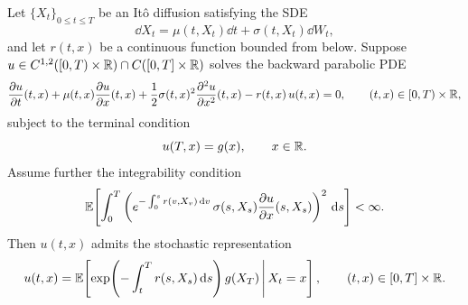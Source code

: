\begin{theorem}
\label{thm:feynman-kac}
Let $\{X_t\}_{0 \le t \le T}$ be an It\^o diffusion satisfying the SDE
\[
\dd X_t = \mu(t, X_t)\dd t + \sigma(t, X_t)\dd W_t,
\]
and let $r(t, x)$ be a continuous function bounded from below. Suppose $u \in C^{1,2}([0, T) \times \mathbb{R}) \cap C([0, T] \times \mathbb{R})$ solves the backward parabolic PDE
\begin{equation}
\label{eq:feynman-kac-pde}
\frac{\partial u}{\partial t}(t, x) + \mu(t, x)\frac{\partial u}{\partial x}(t, x) + \frac{1}{2}\sigma(t, x)^2 \frac{\partial^2 u}{\partial x^2}(t, x) - r(t, x)\, u(t, x) = 0, \qquad (t, x) \in [0, T) \times \mathbb{R},
\end{equation}
subject to the terminal condition
\[
u(T, x) = g(x), \qquad x \in \mathbb{R}.
\]
Assume further the integrability condition
\begin{equation}
\label{eq:fk-integrability}
\mathbb{E}\!\left[\int_0^T \left(e^{-\int_0^s r(v, X_v)\,\mathrm{d} v}\,\sigma(s, X_s)\frac{\partial u}{\partial x}(s, X_s)\right)^2 \,\mathrm{d} s\right] < \infty.
\end{equation}
Then $u(t, x)$ admits the stochastic representation
\begin{equation}
\label{eq:feynman-kac-expectation}
u(t, x) = \mathbb{E}\!\left[\exp\!\left(-\int_t^T r(s, X_s)\,\mathrm{d} s\right) g(X_T) \,\middle|\, X_t = x\right], \qquad (t, x) \in [0, T] \times \mathbb{R}.
\end{equation}
\end{theorem}


